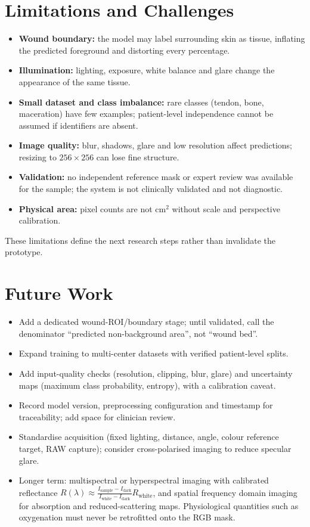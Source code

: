 \documentclass[12pt,a4paper]{article}
\begin{document}
\section{Limitations and Challenges}
\begin{itemize}
\item \textbf{Wound boundary:} the model may label surrounding skin as tissue, inflating the predicted foreground and distorting every percentage.
\item \textbf{Illumination:} lighting, exposure, white balance and glare change the appearance of the same tissue.
\item \textbf{Small dataset and class imbalance:} rare classes (tendon, bone, maceration) have few examples; patient-level independence cannot be assumed if identifiers are absent.
\item \textbf{Image quality:} blur, shadows, glare and low resolution affect predictions; resizing to $256\times256$ can lose fine structure.
\item \textbf{Validation:} no independent reference mask or expert review was available for the sample; the system is not clinically validated and not diagnostic.
\item \textbf{Physical area:} pixel counts are not cm$^2$ without scale and perspective calibration.
\end{itemize}
These limitations define the next research steps rather than invalidate the prototype.

\section{Future Work}
\begin{itemize}
\item Add a dedicated wound-ROI/boundary stage; until validated, call the denominator ``predicted non-background area'', not ``wound bed''.
\item Expand training to multi-center datasets with verified patient-level splits.
\item Add input-quality checks (resolution, clipping, blur, glare) and uncertainty maps (maximum class probability, entropy), with a calibration caveat.
\item Record model version, preprocessing configuration and timestamp for traceability; add space for clinician review.
\item Standardise acquisition (fixed lighting, distance, angle, colour reference target, RAW capture); consider cross-polarised imaging to reduce specular glare.
\item Longer term: multispectral or hyperspectral imaging with calibrated reflectance
$R(\lambda)\approx\frac{I_{\text{sample}}-I_{\text{dark}}}{I_{\text{white}}-I_{\text{dark}}}R_{\text{white}}$, and spatial frequency domain imaging for absorption and reduced-scattering maps. Physiological quantities such as oxygenation must never be retrofitted onto the RGB mask.
\end{itemize}
\end{document}
